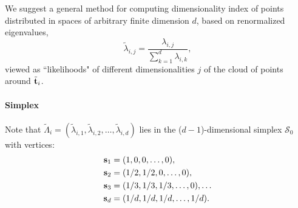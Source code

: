 
We suggest a general method for computing dimensionality index of points distributed in spaces of arbitrary finite dimension $d$, based on renormalized eigenvalues,
\[
\tilde{\lambda}_{i,j} = \frac{\lambda_{i,j}}{\sum_{k=1}^d \lambda_{i,k}},
\]
viewed as ``likelihoods" of different dimensionalities $j$ of the cloud of points around $\tilde{\boldsymbol{\mathbf{t}}}_i$.
\paragraph{Simplex}
Note that
$\tilde{\Lambda}_i = (\tilde{\lambda}_{i,1}, \tilde{\lambda}_{i,2},\dots,\tilde{\lambda}_{i,d})$
lies in the ($d-1$)-dimensional simplex $\mathcal{S}_0$ with vertices:
\begin{align*}
\boldsymbol{\mathbf{s}}_1 &= (1, 0, 0, \dots,0),\\
\boldsymbol{\mathbf{s}}_2 &= (1/2, 1/2, 0, \dots, 0),\\
\boldsymbol{\mathbf{s}}_3 &= (1/3, 1/3, 1/3, \dots, 0),\dots\\
\boldsymbol{\mathbf{s}}_d &= (1/d, 1/d, 1/d, \dots ,1/d).
\end{align*}


